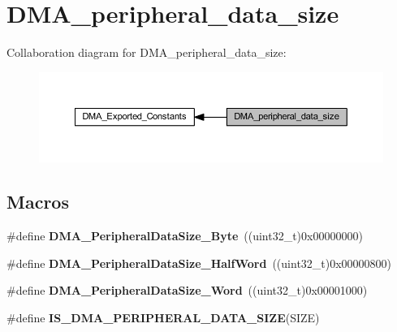 \hypertarget{group___d_m_a__peripheral__data__size}{}\section{D\+M\+A\+\_\+peripheral\+\_\+data\+\_\+size}
\label{group___d_m_a__peripheral__data__size}
Collaboration diagram for D\+M\+A\+\_\+peripheral\+\_\+data\+\_\+size\+:
\nopagebreak
\begin{figure}[H]
\begin{center}
\leavevmode
\includegraphics[width=350pt]{group___d_m_a__peripheral__data__size}
\end{center}
\end{figure}
\subsection*{Macros}
\begin{DoxyCompactItemize}
\item 
\mbox{\label{group___d_m_a__peripheral__data__size_ga7577035ae4ff413164000227a8cea346}} 
\#define {\bfseries D\+M\+A\+\_\+\+Peripheral\+Data\+Size\+\_\+\+Byte}~((uint32\+\_\+t)0x00000000)
\item 
\mbox{\label{group___d_m_a__peripheral__data__size_gab1988e5005ee65c261018f62866e4585}} 
\#define {\bfseries D\+M\+A\+\_\+\+Peripheral\+Data\+Size\+\_\+\+Half\+Word}~((uint32\+\_\+t)0x00000800)
\item 
\mbox{\label{group___d_m_a__peripheral__data__size_ga516ea7a40945d8325fe73e079b245ea1}} 
\#define {\bfseries D\+M\+A\+\_\+\+Peripheral\+Data\+Size\+\_\+\+Word}~((uint32\+\_\+t)0x00001000)
\item 
\#define {\bfseries I\+S\+\_\+\+D\+M\+A\+\_\+\+P\+E\+R\+I\+P\+H\+E\+R\+A\+L\+\_\+\+D\+A\+T\+A\+\_\+\+S\+I\+ZE}(S\+I\+ZE)
\end{DoxyCompactItemize}


